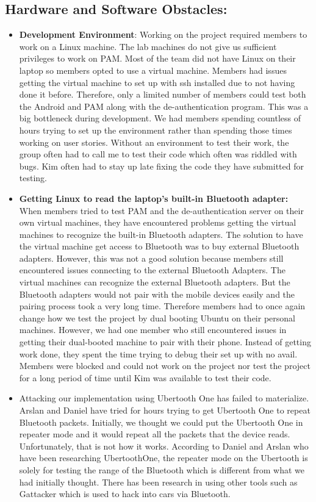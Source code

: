 \documentclass[letterpaper,twocolumn,10pt]{article}
\begin{document}
{{\subsection{Hardware and Software Obstacles:}
\begin{itemize}[noitemsep]
\item \textbf{Development Environment}: Working on the project required members to work on a Linux machine. The lab machines do not give us sufficient privileges to work on PAM. Most of the team did not have Linux on their laptop so members opted to use a virtual machine. Members had issues getting the virtual machine to set up with ssh installed due to not having done it before. Therefore, only a limited number of members could test both the Android and PAM along with the de-authentication program. This was a big bottleneck during development. We had members spending countless of hours trying to set up the environment rather than spending those times working on user stories. Without an environment to test their work, the group often had to call me to test their code which often was riddled with bugs. Kim often had to stay up late fixing the code they have submitted for testing.

\item \textbf{Getting Linux to read the laptop's built-in Bluetooth adapter:} When members tried to test PAM and the de-authentication server on their own virtual machines, they have encountered problems getting the virtual machines to recognize the built-in Bluetooth adapters. The solution to have the virtual machine get access to Bluetooth was to buy external Bluetooth adapters. However, this was not a good solution because members still encountered issues connecting to the external Bluetooth Adapters. The virtual machines can recognize the external Bluetooth adapters. But the Bluetooth adapters would not pair with the mobile devices easily and the pairing process took a very long time. Therefore members had to once again change how we test the project by dual booting Ubuntu on their personal machines. However, we had one member who still encountered issues in getting their dual-booted machine to pair with their phone. Instead of getting work done, they spent the time trying to debug their set up with no avail. Members were blocked and could not work on the project nor test the project for a long period of time until Kim was available to test their code.

\item Attacking our implementation using Ubertooth One has failed to materialize. Arslan and Daniel have tried for hours trying to get Ubertooth One to repeat Bluetooth packets. Initially, we thought we could put the Ubertooth One in repeater mode and it would repeat all the packets that the device reads. Unfortunately, that is not how it works. According to Daniel and Arslan who have been researching UbertoothOne, the repeater mode on the Ubertooth is solely for testing the range of the Bluetooth which is different from what we had initially thought.  There has been research in using other tools such as Gattacker which is used to hack into cars via Bluetooth.
\end{itemize}

}}
\end{document}
